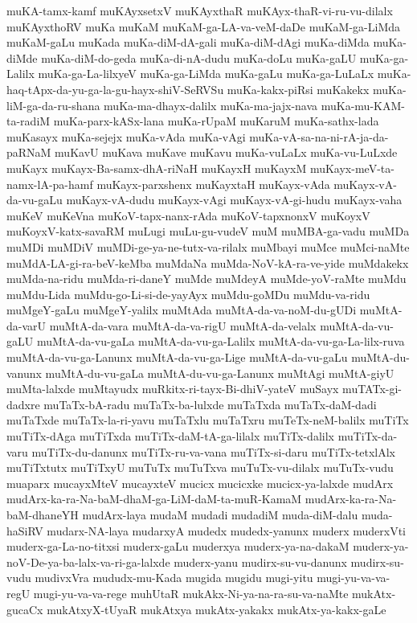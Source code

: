 {muKA-tamx-kamf
muKAyxsetxV
muKAyxthaR
muKAyx-thaR-vi-ru-vu-dilalx
muKAyxthoRV
muKa
muKaM
muKaM-ga-LA-va-veM-daDe
muKaM-ga-LiMda
muKaM-gaLu
muKada
muKa-diM-dA-gali
muKa-diM-dAgi
muKa-diMda
muKa-diMde
muKa-diM-do-geda
muKa-di-nA-dudu
muKa-doLu
muKa-gaLU
muKa-ga-Lalilx
muKa-ga-La-lilxyeV
muKa-ga-LiMda
muKa-gaLu
muKa-ga-LuLaLx
muKa-haq-tApx-da-yu-ga-la-gu-hayx-shiV-SeRVSu
muKa-kakx-piRsi
muKakekx
muKa-liM-ga-da-ru-shana
muKa-ma-dhayx-dalilx
muKa-ma-jajx-nava
muKa-mu-KAM-ta-radiM
muKa-parx-kASx-lana
muKa-rUpaM
muKaruM
muKa-sathx-lada
muKasayx
muKa-sejejx
muKa-vAda
muKa-vAgi
muKa-vA-sa-na-ni-rA-ja-da-paRNaM
muKavU
muKava
muKave
muKavu
muKa-vuLaLx
muKa-vu-LuLxde
muKayx
muKayx-Ba-samx-dhA-riNaH
muKayxH
muKayxM
muKayx-meV-ta-namx-lA-pa-hamf
muKayx-parxshenx
muKayxtaH
muKayx-vAda
muKayx-vA-da-vu-gaLu
muKayx-vA-dudu
muKayx-vAgi
muKayx-vA-gi-hudu
muKayx-vaha
muKeV
muKeVna
muKoV-tapx-nanx-rAda
muKoV-tapxnonxV
muKoyxV
muKoyxV-katx-savaRM
muLugi
muLu-gu-vudeV
muM
muMBA-ga-vadu
muMDa
muMDi
muMDiV
muMDi-ge-ya-ne-tutx-va-rilalx
muMbayi
muMce
muMci-naMte
muMdA-LA-gi-ra-beV-keMba
muMdaNa
muMda-NoV-kA-ra-ve-yide
muMdakekx
muMda-na-ridu
muMda-ri-daneY
muMde
muMdeyA
muMde-yoV-raMte
muMdu
muMdu-Lida
muMdu-go-Li-si-de-yayAyx
muMdu-goMDu
muMdu-va-ridu
muMgeY-gaLu
muMgeY-yalilx
muMtAda
muMtA-da-va-noM-du-gUDi
muMtA-da-varU
muMtA-da-vara
muMtA-da-va-rigU
muMtA-da-velalx
muMtA-da-vu-gaLU
muMtA-da-vu-gaLa
muMtA-da-vu-ga-Lalilx
muMtA-da-vu-ga-La-lilx-ruva
muMtA-da-vu-ga-Lanunx
muMtA-da-vu-ga-Lige
muMtA-da-vu-gaLu
muMtA-du-vanunx
muMtA-du-vu-gaLa
muMtA-du-vu-ga-Lanunx
muMtAgi
muMtA-giyU
muMta-lalxde
muMtayudx
muRkitx-ri-tayx-Bi-dhiV-yateV
muSayx
muTATx-gi-dadxre
muTaTx-bA-radu
muTaTx-ba-lulxde
muTaTxda
muTaTx-daM-dadi
muTaTxde
muTaTx-la-ri-yavu
muTaTxlu
muTaTxru
muTeTx-neM-balilx
muTiTx
muTiTx-dAga
muTiTxda
muTiTx-daM-tA-ga-lilalx
muTiTx-dalilx
muTiTx-da-varu
muTiTx-du-danunx
muTiTx-ru-va-vana
muTiTx-si-daru
muTiTx-tetxlAlx
muTiTxtutx
muTiTxyU
muTuTx
muTuTxva
muTuTx-vu-dilalx
muTuTx-vudu
muaparx
mucayxMteV
mucayxteV
mucicx
mucicxke
mucicx-ya-lalxde
mudArx
mudArx-ka-ra-Na-baM-dhaM-ga-LiM-daM-ta-muR-KamaM
mudArx-ka-ra-Na-baM-dhaneYH
mudArx-laya
mudaM
mudadi
mudadiM
muda-diM-dalu
muda-haSiRV
mudarx-NA-laya
mudarxyA
mudedx
mudedx-yanunx
muderx
muderxVti
muderx-ga-La-no-titxsi
muderx-gaLu
muderxya
muderx-ya-na-dakaM
muderx-ya-noV-De-ya-ba-lalx-va-ri-ga-lalxde
muderx-yanu
mudirx-su-vu-danunx
mudirx-su-vudu
mudivxVra
mududx-mu-Kada
mugida
mugidu
mugi-yitu
mugi-yu-va-va-regU
mugi-yu-va-va-rege
muhUtaR
mukAkx-Ni-ya-na-ra-su-va-naMte
mukAtx-gucaCx
mukAtxyX-tUyaR
mukAtxya
mukAtx-yakakx
mukAtx-ya-kakx-gaLe
}
